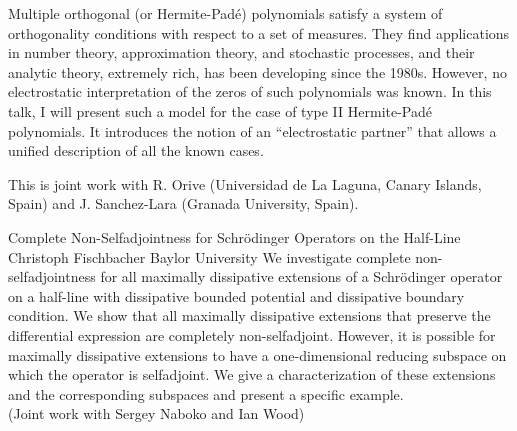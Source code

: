 \begin{addmargin}[2em]{0em}
{Multiple orthogonal (or Hermite-Padé) polynomials satisfy a system of orthogonality conditions with respect to a set of measures. They find applications in number theory, approximation theory, and stochastic processes, and their analytic theory, extremely rich, has been developing since the 1980s. However, no electrostatic interpretation of the zeros of such polynomials was known. In this talk, I will present such a model for the case of type II Hermite-Padé polynomials. It introduces the notion of an “electrostatic partner” that allows a unified description of all the known cases.

This is joint work with R. Orive (Universidad de La Laguna, Canary Islands, Spain) and J. Sanchez-Lara (Granada University, Spain).}


\vspace{1.5ex}
\abs
{Complete Non-Selfadjointness for Schr\"odinger Operators on the Half-Line}
{Christoph Fischbacher}
{Baylor University}
{We investigate complete non-selfadjointness for all maximally dissipative extensions of a Schr\"odinger operator on a half-line with dissipative bounded potential and dissipative boundary condition. We show that all maximally dissipative extensions that preserve the differential expression are completely non-selfadjoint. However, it is possible for maximally dissipative extensions to have a one-dimensional reducing subspace on which the operator is selfadjoint. We give a characterization of these extensions and the corresponding subspaces and present a specific example.\\
(Joint work with Sergey Naboko and Ian Wood)}
\end{addmargin}
